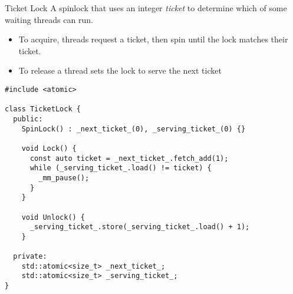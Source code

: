 \begin{definitionbox}{Ticket Lock}
  A spinlock that uses an integer \textit{ticket} to determine which of some waiting threads can run.
  \begin{itemize}
    \item To acquire, threads request a ticket, then spin until the lock matches their ticket.
    \item To release a thread sets the lock to serve the next ticket
  \end{itemize}
\end{definitionbox}

\begin{verbatim}
#include <atomic>

class TicketLock {
  public:
    SpinLock() : _next_ticket_(0), _serving_ticket_(0) {}

    void Lock() {
      const auto ticket = _next_ticket_.fetch_add(1);
      while (_serving_ticket_.load() != ticket) {
        _mm_pause();
      }
    }

    void Unlock() {
      _serving_ticket_.store(_serving_ticket_.load() + 1);
    }
  
  private:
    std::atomic<size_t> _next_ticket_;
    std::atomic<size_t> _serving_ticket_;
}
\end{verbatim}

